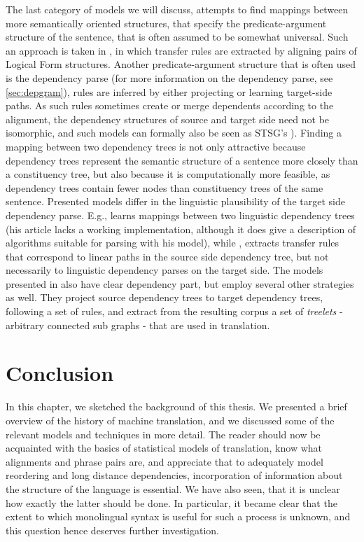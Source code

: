 The last category of models we will discuss, attempts to find mappings between more semantically oriented structures, that specify the predicate-argument structure of the sentence, that is often assumed to be somewhat universal. Such an approach is taken in \cite{menezes2003best}, in which transfer rules are extracted by aligning pairs of Logical Form structures. Another predicate-argument structure that is often used is the dependency parse (for more information on the dependency parse, see \ref{sec:depgram}), rules are inferred by either projecting or learning target-side paths. As such rules sometimes create or merge dependents according to the alignment, the dependency structures of source and target side need not be isomorphic, and such models can formally also be seen as STSG's \citep[as made explicit in][]{eisner2003learning}). Finding a mapping between two dependency trees is not only attractive because dependency trees represent the semantic structure of a sentence more closely than a constituency tree, but also because it is computationally more feasible, as dependency trees contain fewer nodes than constituency trees of the same sentence. Presented models differ in the linguistic plausibility of the target side dependency parse. E.g., \cite{eisner2003learning} learns mappings between two linguistic dependency trees (his article lacks a working implementation, although it does give a description of algorithms suitable for parsing with his model), while \cite{lin2004path}, extracts transfer rules that correspond to linear paths in the source side dependency tree, but not necessarily to linguistic dependency parses on the target side. The models presented in \cite{quirk2005dependency,quirk2006dependency,quirk2006we} also have clear dependency part, but employ several other strategies as well. They project source dependency trees to target dependency trees, following a set of rules, and extract from the resulting corpus a set of \textit{treelets} - arbitrary connected sub graphs - that are used in translation.

\section{Conclusion}

In this chapter, we sketched the background of this thesis. We presented a brief overview of the history of machine translation, and we discussed some of the relevant models and techniques in more detail. The reader should now be acquainted with the basics of statistical models of translation, know what alignments and phrase pairs are, and appreciate that to adequately model reordering and long distance dependencies, incorporation of information about the structure of the language is essential. We have also seen, that it is
 unclear how exactly the latter should be done. In particular, it became clear that the extent to which monolingual syntax is useful for such a process is unknown, and this question hence deserves further investigation.